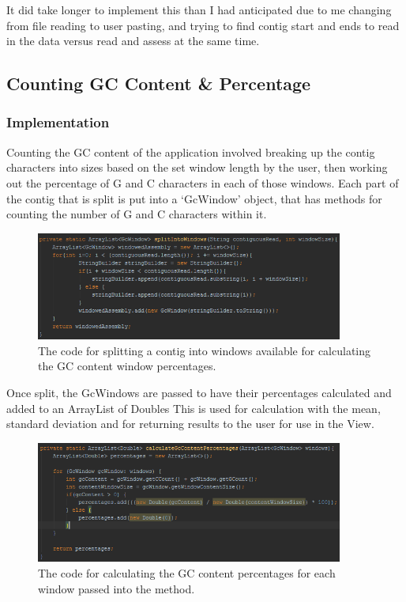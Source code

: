 It did take longer to implement this than I had anticipated due to me changing from file reading to user pasting, and trying to find contig start and ends to read in the data versus read and assess at the same time.

\subsection{Counting GC Content \& Percentage}
\subsubsection{Implementation}
Counting the GC content of the application involved breaking up the contig characters into sizes based on the set window length by the user, then working out the percentage of G and C characters in each of those windows. Each part of the contig that is split is put into a `GcWindow' object, that has methods for counting the number of G and C characters within it.

\begin{figure}[H]
\centering
\includegraphics[width=0.9\textwidth]{images/splitgcwindows}
\caption{The code for splitting a contig into windows available for calculating the GC content window percentages.}
\end{figure}

Once split, the GcWindows are passed to have their percentages calculated and added to an ArrayList of Doubles This is used for calculation with the mean, standard deviation and for returning results to the user for use in the View.

\begin{figure}[H]
\centering
\includegraphics[width=0.9\textwidth]{images/calcgcpercentage}
\caption{The code for calculating the GC content percentages for each window passed into the method.}
\end{figure}

